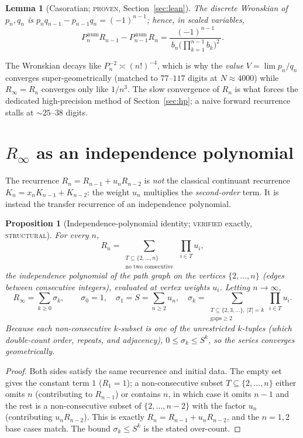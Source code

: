 \documentclass[11pt]{article}
\newtheorem{proposition}{Proposition}
\newtheorem{lemma}{Lemma}
\newcommand{\Rinf}{R_\infty}
\begin{document}
\begin{lemma}[Casoratian; \textsc{proven}, Section~\ref{sec:lean}]\label{lem:caso}
The discrete Wronskian of $p_n,q_n$ is $p_nq_{n-1}-p_{n-1}q_n=(-1)^{n-1}$; hence,
in scaled variables,
\[
  P^{\,\mathrm{num}}_nR_{n-1}-P^{\,\mathrm{num}}_{n-1}R_n
   =\frac{(-1)^{n-1}}{\,b_n\big(\prod_{k=1}^{n-1}b_k\big)^2\,}.
\]
\end{lemma}

The Wronskian decays like $P_n^{-2}\asymp(n!)^{-4}$, which is why the
\emph{value} $V=\lim p_n/q_n$ converges super-geometrically (matched to
$77$--$117$ digits at $N\approx4000$) while $\Rinf=R_n$ converges only like
$1/n^3$. The slow convergence of $R_n$ is what forces the dedicated high-precision
method of Section~\ref{sec:hp}; a naive forward recurrence stalls at $\sim25$--$38$
digits.

\section{$\Rinf$ as an independence polynomial}\label{sec:indpoly}

The recurrence $R_n=R_{n-1}+u_nR_{n-2}$ is \emph{not} the classical continuant
recurrence $K_n=x_nK_{n-1}+K_{n-2}$: the weight $u_n$ multiplies the
\emph{second-order} term. It is instead the transfer recurrence of an independence
polynomial.

\begin{proposition}[Independence-polynomial identity; \textsc{verified} exactly,
\textsc{structural}]\label{prop:indpoly}
For every $n$,
\[
  R_n=\sum_{\substack{T\subseteq\{2,\dots,n\}\\ \text{no two consecutive}}}
       \ \prod_{i\in T}u_i,
\]
the independence polynomial of the path graph on the vertices $\{2,\dots,n\}$
(edges between consecutive integers), evaluated at vertex weights $u_i$. Letting
$n\to\infty$,
\begin{equation}\label{eq:cluster}
  \Rinf=\sum_{k\ge0}\sigma_k,\qquad
  \sigma_0=1,\quad \sigma_1=S=\sum_{n\ge2}u_n,\quad
  \sigma_k=\!\!\sum_{\substack{T\subseteq\{2,3,\dots\},\ |T|=k\\ \text{gaps}\ge2}}
            \prod_{i\in T}u_i .
\end{equation}
Because each non-consecutive $k$-subset is one of the unrestricted $k$-tuples
(which double-count order, repeats, and adjacency), $0\le\sigma_k\le S^k$, so the
series converges geometrically.
\end{proposition}

\begin{proof}
Both sides satisfy the same recurrence and initial data. The empty set gives the
constant term $1$ ($R_1=1$); a non-consecutive subset $T\subseteq\{2,\dots,n\}$
either omits $n$ (contributing to $R_{n-1}$) or contains $n$, in which case it omits
$n-1$ and the rest is a non-consecutive subset of $\{2,\dots,n-2\}$ with the factor
$u_n$ (contributing $u_nR_{n-2}$). This is exactly $R_n=R_{n-1}+u_nR_{n-2}$, and the
$n=1,2$ base cases match. The bound $\sigma_k\le S^k$ is the stated over-count.
\end{proof}
\end{document}
